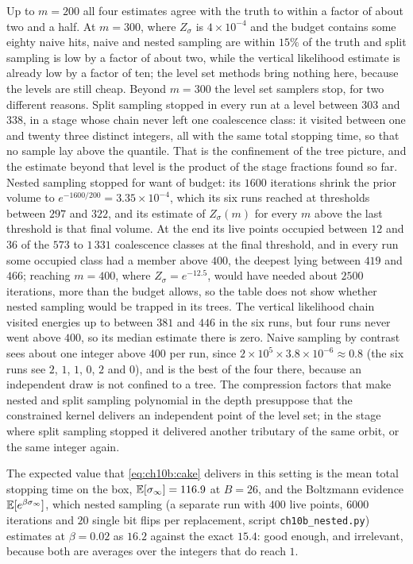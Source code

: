 Up to $m=200$ all four estimates agree with the truth to within a factor of about two and a half.
At $m=300$, where $Z_\sigma$ is $4\times10^{-4}$ and the budget contains some eighty naive hits, naive and nested sampling are within $15\%$ of the truth and split sampling is low by a factor of about two, while the vertical likelihood estimate is already low by a factor of ten; the level set methods bring nothing here, because the levels are still cheap.
Beyond $m=300$ the level set samplers stop, for two different reasons.
Split sampling stopped in every run at a level between $303$ and $338$, in a stage whose chain never left one coalescence class: it visited between one and twenty three distinct integers, all with the same total stopping time, so that no sample lay above the quantile. That is the confinement of the tree picture, and the estimate beyond that level is the product of the stage fractions found so far.
Nested sampling stopped for want of budget: its $1600$ iterations shrink the prior volume to $e^{-1600/200}=3.35\times10^{-4}$, which its six runs reached at thresholds between $297$ and $322$, and its estimate of $Z_\sigma(m)$ for every $m$ above the last threshold is that final volume.
At the end its live points occupied between $12$ and $36$ of the $573$ to $1\,331$ coalescence classes at the final threshold, and in every run some occupied class had a member above $400$, the deepest lying between $419$ and $466$; reaching $m=400$, where $Z_\sigma=e^{-12.5}$, would have needed about $2500$ iterations, more than the budget allows, so the table does not show whether nested sampling would be trapped in its trees.
The vertical likelihood chain visited energies up to between $381$ and $446$ in the six runs, but four runs never went above $400$, so its median estimate there is zero.
Naive sampling by contrast sees about one integer above $400$ per run, since $2\times10^5\times3.8\times10^{-6}\approx0.8$ (the six runs see $2$, $1$, $1$, $0$, $2$ and $0$), and is the best of the four there, because an independent draw is not confined to a tree.
The compression factors that make nested and split sampling
polynomial in the depth presuppose that the constrained kernel delivers an
independent point of the level set; in the stage where split sampling stopped it delivered another tributary of the same orbit, or the same integer again.

The expected value that \eqref{eq:ch10b:cake} delivers in this setting is the
mean total stopping time on the box, $\mathbb{E}[\sigma_\infty]=116.9$ at $B=26$, and
the Boltzmann evidence $\mathbb{E}[e^{\beta\sigma_\infty}]$, which nested sampling
(a separate run with $400$ live points, $6000$ iterations and $20$ single bit flips per replacement, script \texttt{ch10b\_nested.py}) estimates at $\beta=0.02$ as $16.2$ against the exact $15.4$: good enough, and
irrelevant, because both are averages over the integers that do reach $1$.


